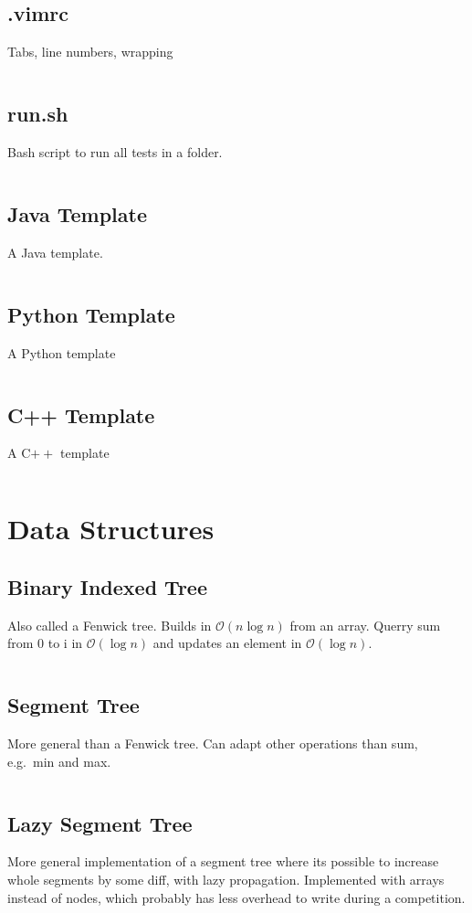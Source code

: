 \documentclass[8pt,a4paper,landscape,oneside]{amsart}
\newcommand{\codej}[1]{\inputminted[fontsize=\large,tabsize=2,baselinestretch=1]{java}{code/#1}}
\newcommand{\codec}[1]{\inputminted[fontsize=\large,tabsize=2,baselinestretch=1]{cpp}{code/#1}}
\newcommand{\codep}[1]{\inputminted[fontsize=\large,tabsize=2,baselinestretch=1]{py}{code/#1}}
\newcommand{\codeb}[1]{\inputminted[fontsize=\large,tabsize=2,baselinestretch=1]{bash}{code/#1}}
\newcommand{\codev}[1]{\inputminted[fontsize=\large,tabsize=2,baselinestretch=1]{vim}{code/#1}}
\newcommand{\bigO}{\mathcal{O}}
\begin{document}
\begin{multicols*}{2}
\begin{large}
    \subsection{.vimrc}
        Tabs, line numbers, wrapping
        \codev{.vimrc}
    \subsection{run.sh}
        Bash script to run all tests in a folder.
        \codeb{run.sh}
    \subsection{Java Template}
        A Java template.
        \codej{template.java}
    \subsection{Python Template}
        A Python template
        \codep{template.py}
    \subsection{C++ Template}
        A C$++$ template
        \codec{template.cpp}

\section{Data Structures}
    \subsection{Binary Indexed Tree}
        Also called a Fenwick tree. Builds in $\bigO(n \log{n})$ from an array. Querry sum from 0 to i in $\bigO(\log{n})$ and updates an element in $\bigO(\log{n})$.
        \codej{DS/BIT.java}
    \subsection{Segment Tree}
        More general than a Fenwick tree. Can adapt other operations than sum, e.g.\ min and max.
        \codej{DS/ST.java}
    \subsection{Lazy Segment Tree}
        More general implementation of a segment tree where its possible to increase whole segments by some diff, with lazy propagation. Implemented with arrays instead of nodes, which probably has less overhead to write during a competition.
        \codej{DS/LazySegmentTree.java}

\end{large}
\end{multicols*}
\end{document}
